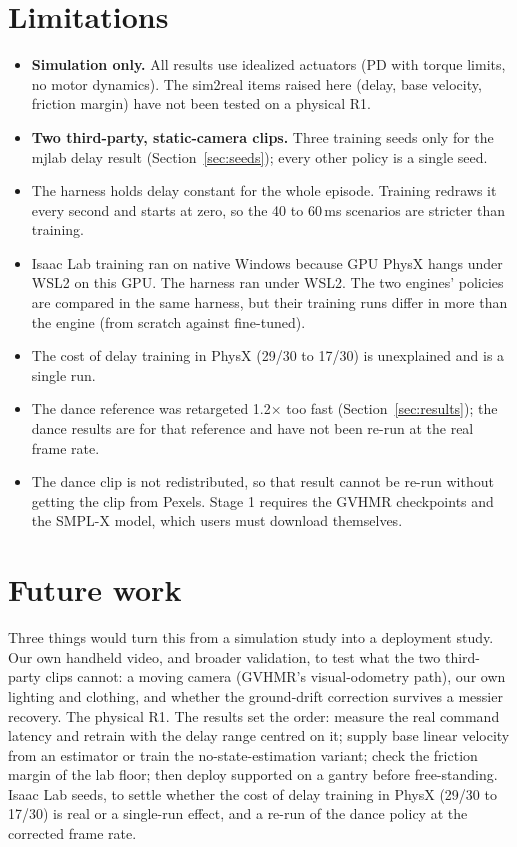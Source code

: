 \documentclass[11pt]{article}
\begin{document}
\section{Limitations}
\begin{itemize}
\item \textbf{Simulation only.} All results use idealized actuators (PD with torque limits, no motor dynamics). The sim2real items raised here (delay, base velocity, friction margin) have not been tested on a physical R1.
\item \textbf{Two third-party, static-camera clips.} Three training seeds only for the mjlab delay result (Section~\ref{sec:seeds}); every other policy is a single seed.
\item The harness holds delay constant for the whole episode. Training redraws it every second and starts at zero, so the 40 to 60\,ms scenarios are stricter than training.
\item Isaac Lab training ran on native Windows because GPU PhysX hangs under WSL2 on this GPU. The harness ran under WSL2. The two engines' policies are compared in the same harness, but their training runs differ in more than the engine (from scratch against fine-tuned).
\item The cost of delay training in PhysX (29/30 to 17/30) is unexplained and is a single run.
\item The dance reference was retargeted 1.2$\times$ too fast (Section~\ref{sec:results}); the dance results are for that reference and have not been re-run at the real frame rate.
\item The dance clip is not redistributed, so that result cannot be re-run without getting the clip from Pexels. Stage 1 requires the GVHMR checkpoints and the SMPL-X model, which users must download themselves.
\end{itemize}

\section{Future work}\label{sec:future}
Three things would turn this from a simulation study into a deployment study. Our own handheld video, and broader validation, to test what the two third-party clips cannot: a moving camera (GVHMR's visual-odometry path), our own lighting and clothing, and whether the ground-drift correction survives a messier recovery. The physical R1. The results set the order: measure the real command latency and retrain with the delay range centred on it; supply base linear velocity from an estimator or train the no-state-estimation variant; check the friction margin of the lab floor; then deploy supported on a gantry before free-standing. Isaac Lab seeds, to settle whether the cost of delay training in PhysX (29/30 to 17/30) is real or a single-run effect, and a re-run of the dance policy at the corrected frame rate.
\end{document}
